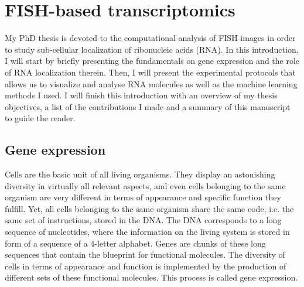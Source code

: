 
\graphicspath{{./figures/introduction/}}

\chapter{FISH-based transcriptomics}
\label{ch:introduction}

\minitoc
\newpage

My PhD thesis is devoted to the computational analysis of FISH images in order to study sub-cellular localization of ribonucleic acids (\ac{RNA}). In this introduction, I will start by briefly presenting the fundamentals on gene expression and the role of RNA localization therein. 
Then, I will present the experimental protocols that allows us to visualize and analyse \ac{RNA} molecules as well as the machine learning methods I used.
I will finish this introduction with an overview of my thesis objectives, a list of the contributions I made and a summary of this manuscript to guide the reader.

\section{Gene expression}
\label{sec:gene_expression}

Cells are the basic unit of all living organisms. They display an astonishing diversity in virtually all relevant aspects, and even cells belonging to the same organism are very different in terms of appearance and specific function they fulfill. Yet, all cells belonging to the same organism share the same code, i.e. the same set of instructions, stored in the DNA. The DNA corresponds to a long sequence of nucleotides, where the information on the living system is stored in form of a sequence of a 4-letter alphabet. Genes are chunks of these long sequences that contain the blueprint for functional molecules. The diversity of cells in terms of appearance and function is implemented by the production of different sets of these functional molecules. This process is called gene expression.  

